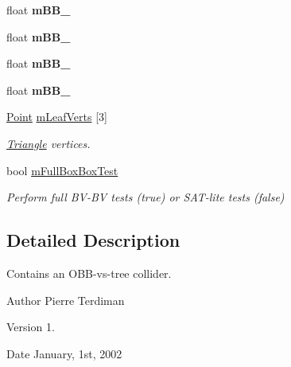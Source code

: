 \begin{DoxyCompactItemize}
\item 
float {\bfseries m\+B\+B\+\_}\hypertarget{classOBBCollider_ad60595833b8626f182a69536737c0a34}{}\label{classOBBCollider_ad60595833b8626f182a69536737c0a34}

\item 
float {\bfseries m\+B\+B\+\_}\hypertarget{classOBBCollider_a5be6b9a63136d2a57162b0f61dd1abf2}{}\label{classOBBCollider_a5be6b9a63136d2a57162b0f61dd1abf2}

\item 
float {\bfseries m\+B\+B\+\_}\hypertarget{classOBBCollider_a7cbb8b569756091d6a10c5774f561d86}{}\label{classOBBCollider_a7cbb8b569756091d6a10c5774f561d86}

\item 
float {\bfseries m\+B\+B\+\_}\hypertarget{classOBBCollider_ad12058c42c9e2dc31f4cd8416b3bc963}{}\label{classOBBCollider_ad12058c42c9e2dc31f4cd8416b3bc963}

\item 
\hyperlink{classPoint}{Point} \hyperlink{classOBBCollider_a23dc8fecb5ba4c64bea47b218e0a9570}{m\+Leaf\+Verts} \mbox{[}3\mbox{]}\hypertarget{classOBBCollider_a23dc8fecb5ba4c64bea47b218e0a9570}{}\label{classOBBCollider_a23dc8fecb5ba4c64bea47b218e0a9570}

\begin{DoxyCompactList}\small\item\em \hyperlink{classTriangle}{Triangle} vertices. \end{DoxyCompactList}\item 
bool \hyperlink{classOBBCollider_a7b07a8f74b083bc75d3fa798cd4ec9cd}{m\+Full\+Box\+Box\+Test}\hypertarget{classOBBCollider_a7b07a8f74b083bc75d3fa798cd4ec9cd}{}\label{classOBBCollider_a7b07a8f74b083bc75d3fa798cd4ec9cd}

\begin{DoxyCompactList}\small\item\em Perform full B\+V-\/\+BV tests (true) or S\+A\+T-\/lite tests (false) \end{DoxyCompactList}\end{DoxyCompactItemize}


\subsection{Detailed Description}
Contains an O\+B\+B-\/vs-\/tree collider.

\begin{DoxyAuthor}{Author}
Pierre Terdiman 
\end{DoxyAuthor}
\begin{DoxyVersion}{Version}
1. 
\end{DoxyVersion}
\begin{DoxyDate}{Date}
January, 1st, 2002 
\end{DoxyDate}


